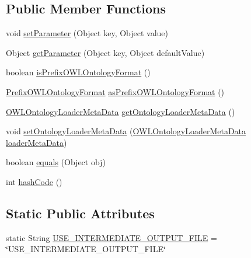 \subsection*{Public Member Functions}
\begin{DoxyCompactItemize}
\item 
void \hyperlink{classorg_1_1semanticweb_1_1owlapi_1_1model_1_1_o_w_l_ontology_format_a32ebd15c966f45dfe9a98427dd7c5982}{set\-Parameter} (Object key, Object value)
\item 
Object \hyperlink{classorg_1_1semanticweb_1_1owlapi_1_1model_1_1_o_w_l_ontology_format_a43cf96600f2127fe1753b8873f26ce41}{get\-Parameter} (Object key, Object default\-Value)
\item 
boolean \hyperlink{classorg_1_1semanticweb_1_1owlapi_1_1model_1_1_o_w_l_ontology_format_af256a7f99c984eaffa4f7372e7a3bdca}{is\-Prefix\-O\-W\-L\-Ontology\-Format} ()
\item 
\hyperlink{classorg_1_1semanticweb_1_1owlapi_1_1vocab_1_1_prefix_o_w_l_ontology_format}{Prefix\-O\-W\-L\-Ontology\-Format} \hyperlink{classorg_1_1semanticweb_1_1owlapi_1_1model_1_1_o_w_l_ontology_format_a568a8e846fe08c2402a24111178dcd19}{as\-Prefix\-O\-W\-L\-Ontology\-Format} ()
\item 
\hyperlink{interfaceorg_1_1semanticweb_1_1owlapi_1_1io_1_1_o_w_l_ontology_loader_meta_data}{O\-W\-L\-Ontology\-Loader\-Meta\-Data} \hyperlink{classorg_1_1semanticweb_1_1owlapi_1_1model_1_1_o_w_l_ontology_format_a9d4751d463c7d1f2717e5f92bd3541c3}{get\-Ontology\-Loader\-Meta\-Data} ()
\item 
void \hyperlink{classorg_1_1semanticweb_1_1owlapi_1_1model_1_1_o_w_l_ontology_format_aeee38db6af9b8194409770d0f8f63d5c}{set\-Ontology\-Loader\-Meta\-Data} (\hyperlink{interfaceorg_1_1semanticweb_1_1owlapi_1_1io_1_1_o_w_l_ontology_loader_meta_data}{O\-W\-L\-Ontology\-Loader\-Meta\-Data} \hyperlink{classorg_1_1semanticweb_1_1owlapi_1_1model_1_1_o_w_l_ontology_format_ac73e8fb3327a67e4769794c3910d33cb}{loader\-Meta\-Data})
\item 
boolean \hyperlink{classorg_1_1semanticweb_1_1owlapi_1_1model_1_1_o_w_l_ontology_format_a80b44ebb22054e8e1e0617a3f08e01b5}{equals} (Object obj)
\item 
int \hyperlink{classorg_1_1semanticweb_1_1owlapi_1_1model_1_1_o_w_l_ontology_format_a503e4258838f3920a86bb6b5e6bea986}{hash\-Code} ()
\end{DoxyCompactItemize}
\subsection*{Static Public Attributes}
\begin{DoxyCompactItemize}
\item 
static String \hyperlink{classorg_1_1semanticweb_1_1owlapi_1_1model_1_1_o_w_l_ontology_format_a8fb685783a685bc36f7f966b066d2c77}{U\-S\-E\-\_\-\-I\-N\-T\-E\-R\-M\-E\-D\-I\-A\-T\-E\-\_\-\-O\-U\-T\-P\-U\-T\-\_\-\-F\-I\-L\-E} = \char`\"{}U\-S\-E\-\_\-\-I\-N\-T\-E\-R\-M\-E\-D\-I\-A\-T\-E\-\_\-\-O\-U\-T\-P\-U\-T\-\_\-\-F\-I\-L\-E\char`\"{}
\end{DoxyCompactItemize}
